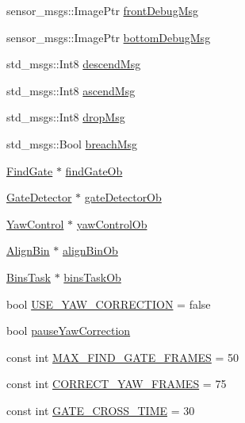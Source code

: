 \begin{DoxyCompactItemize}
sensor\+\_\+msgs\+::\+Image\+Ptr \hyperlink{classPathPlanner_a54f52fe7a3bad416e15f326b807692e2}{front\+Debug\+Msg}
\item 
sensor\+\_\+msgs\+::\+Image\+Ptr \hyperlink{classPathPlanner_a351514e893a8b37984aa678f6ede8211}{bottom\+Debug\+Msg}
\item 
std\+\_\+msgs\+::\+Int8 \hyperlink{classPathPlanner_ad7a30801fb56f1f2a5bf02d99b21ca5a}{descend\+Msg}
\item 
std\+\_\+msgs\+::\+Int8 \hyperlink{classPathPlanner_a5abd76dde4ea570d1f558336ac13f3e4}{ascend\+Msg}
\item 
std\+\_\+msgs\+::\+Int8 \hyperlink{classPathPlanner_aca9f8a364babea5db6c9ff8cc98addbc}{drop\+Msg}
\item 
std\+\_\+msgs\+::\+Bool \hyperlink{classPathPlanner_a1ac63d92d2bee1644f7b2e80d6cc5c09}{breach\+Msg}
\item 
\hyperlink{classFindGate}{Find\+Gate} $\ast$ \hyperlink{classPathPlanner_a411050611aa7ccad2bcbfe8aa8c8698f}{find\+Gate\+Ob}
\item 
\hyperlink{classGateDetector}{Gate\+Detector} $\ast$ \hyperlink{classPathPlanner_af11812439e12931a6f3d744e358e91e4}{gate\+Detector\+Ob}
\item 
\hyperlink{classYawControl}{Yaw\+Control} $\ast$ \hyperlink{classPathPlanner_a8abc38307d93b4feecb14a8ece4764a6}{yaw\+Control\+Ob}
\item 
\hyperlink{classAlignBin}{Align\+Bin} $\ast$ \hyperlink{classPathPlanner_a2953c40a460f99cf2b767b5ab5cb7f3e}{align\+Bin\+Ob}
\item 
\hyperlink{classBinsTask}{Bins\+Task} $\ast$ \hyperlink{classPathPlanner_ab66992788cfdfc1a443bfa97af547100}{bins\+Task\+Ob}
\item 
bool \hyperlink{classPathPlanner_a54e431dfde30e0b15a372c5a16c8dd6c}{U\+S\+E\+\_\+\+Y\+A\+W\+\_\+\+C\+O\+R\+R\+E\+C\+T\+I\+ON} = false
\item 
bool \hyperlink{classPathPlanner_a15a968b0bc50d230bbc22e9099377504}{pause\+Yaw\+Correction}
\item 
const int \hyperlink{classPathPlanner_ada301b950a4d1b14acd2477fbc5f73df}{M\+A\+X\+\_\+\+F\+I\+N\+D\+\_\+\+G\+A\+T\+E\+\_\+\+F\+R\+A\+M\+ES} = 50
\item 
const int \hyperlink{classPathPlanner_ab80757ecd2962cc2e5bd64c300e31628}{C\+O\+R\+R\+E\+C\+T\+\_\+\+Y\+A\+W\+\_\+\+F\+R\+A\+M\+ES} = 75
\item 
const int \hyperlink{classPathPlanner_a11a499117aadaae4036d58bd4b63d7ac}{G\+A\+T\+E\+\_\+\+C\+R\+O\+S\+S\+\_\+\+T\+I\+ME} = 30

\end{DoxyCompactItemize}
